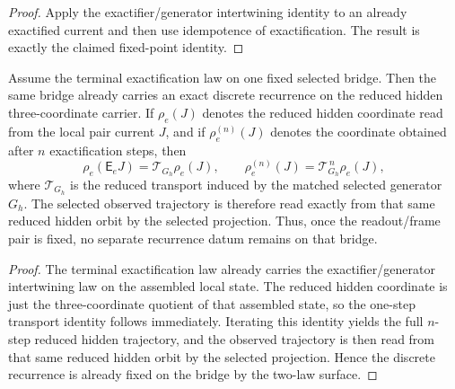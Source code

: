 \begin{proof}
Apply the exactifier/generator intertwining identity to an already exactified
current and then use idempotence of exactification. The result is exactly the
claimed fixed-point identity.
\end{proof}

\begin{theorem}
\label{thm:terminal-exactification-determines-the-discrete-bridge-local-recurrence}
Assume the terminal exactification law on one fixed selected bridge. Then the
same bridge already carries an exact discrete recurrence on the reduced hidden
three-coordinate carrier. If \(\rho_e(J)\) denotes the reduced hidden
coordinate read from the local pair current \(J\), and if
\(\rho_e^{(n)}(J)\) denotes the coordinate obtained after \(n\) exactification
steps, then
\[
\rho_e(\mathsf E_e J)=\mathcal T_{G_h}\rho_e(J),
\qquad
\rho_e^{(n)}(J)=\mathcal T_{G_h}^{\,n}\rho_e(J),
\]
where \(\mathcal T_{G_h}\) is the reduced transport induced by the matched
selected generator \(G_h\). The selected observed trajectory is therefore read
exactly from that same reduced hidden orbit by the selected projection. Thus,
once the readout/frame pair is fixed, no separate recurrence datum remains on
that bridge.
\end{theorem}

\begin{proof}
The terminal exactification law already carries the exactifier/generator
intertwining law on the assembled local state. The reduced hidden coordinate is
just the three-coordinate quotient of that assembled state, so the one-step
transport identity follows immediately. Iterating this identity yields the full
\(n\)-step reduced hidden trajectory, and the observed trajectory is then read
from that same reduced hidden orbit by the selected projection. Hence the
discrete recurrence is already fixed on the bridge by the two-law surface.
\end{proof}

